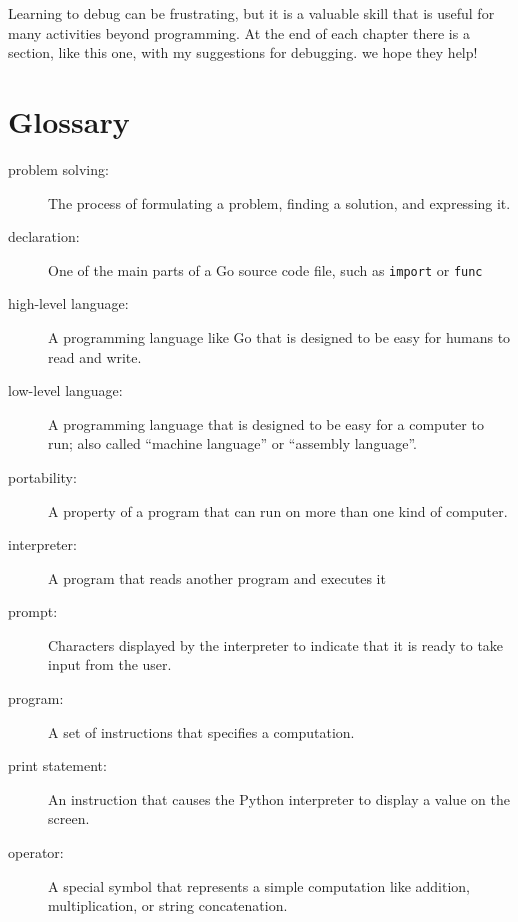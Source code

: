 Learning to debug can be frustrating, but it is a valuable skill that is
useful for many activities beyond programming. At the end of each chapter
there is a section, like this one, with my suggestions for debugging. we hope
they help!


\section{Glossary}

\begin{description}

\item[problem solving:]  The process of formulating a problem, finding
a solution, and expressing it.

\item[declaration:] One of the main parts of a Go source code file, such
as {\tt import} or {\tt func} 

\item[high-level language:]  A programming language like Go that
is designed to be easy for humans to read and write.

\item[low-level language:]  A programming language that is designed
to be easy for a computer to run; also called ``machine language'' or
``assembly language''.

\item[portability:]  A property of a program that can run on more
than one kind of computer.

\item[interpreter:]  A program that reads another program and executes
it

\item[prompt:] Characters displayed by the interpreter to indicate
that it is ready to take input from the user.

\item[program:] A set of instructions that specifies a computation.

\item[print statement:]  An instruction that causes the Python
interpreter to display a value on the screen.

\item[operator:]  A special symbol that represents a simple computation like
addition, multiplication, or string concatenation.


\end{description}
